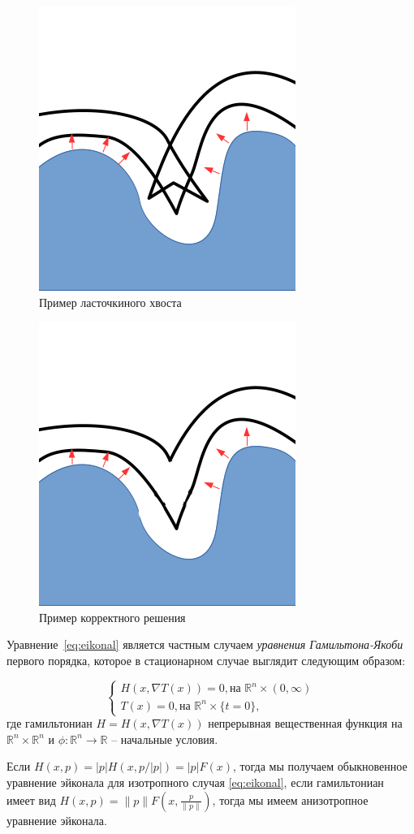 \begin{figure}[h]
  \centering
  \includegraphics[width=0.3\linewidth]{img/swallow-tail-example.png}
  \hfil \caption{Пример ласточкиного хвоста}
  \label{fig:swallow-ex}

\end{figure}

\begin{figure}[h]
  \centering
  \includegraphics[width=0.3\linewidth]{img/corrct-example.png}
  \hfil \caption{Пример корректного решения}
  \label{fig:correct-exmp}

\end{figure}

Уравнение~\eqref{eq:eikonal} является частным случаем \textit{уравнения
Гамильтона-Якоби} первого порядка, которое в стационарном случае выглядит
следующим образом:

\begin{equation}
  \label{eq:hje}
  \left\{ \begin{matrix}
      H(x, \nabla T(x)) = 0,\text{на } \mathbb{R}^n \times (0,\infty) \\
      T(x) = 0,  \text{на } \mathbb{R}^n \times \{t = 0\},
    \end{matrix}\right.
\end{equation}
где гамильтониан $H = H(x,\nabla T(x))$ непрерывная вещественная функция на
$\mathbb{R}^n \times \mathbb{R}^n$ и $\phi : \mathbb{R}^n \rightarrow
\mathbb{R}$ -- начальные условия.

Если $H(x,p) = |p| H(x,p/|p|) = |p| F(x)$, тогда мы получаем
обыкновенное уравнение эйконала для изотропного случая
\eqref{eq:eikonal}, если гамильтониан имеет вид
$H(x,p) = \|p\| F(x, \frac{p}{\|p\|})$, тогда мы имеем анизотропное
уравнение эйконала.

